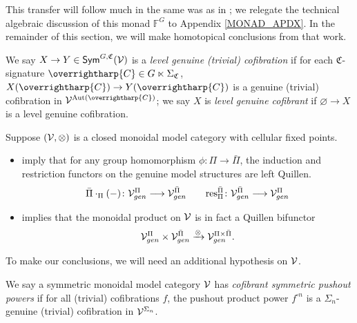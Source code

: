 \documentclass[a4paper,10pt
,draft
]{article}%
\renewcommand{\1}{\eta}%
\newcommand{\SC}{\Sigma_{\mathfrak C}}
\newcommand{\vect}[1]{\text{\overrightharp{\ensuremath{#1}}}}
\begin{document}
This transfer will follow much in the same was as in \cite{BP_geo};
we relegate the technical algebraic discussion of this monad $\mathbb F^G$ to Appendix \ref{MONAD_APDX}.
In the remainder of this section, we will make homotopical conclusions from that work.

\begin{definition}
      We say $X \to Y \in \mathsf{Sym}^{G, \mathfrak C}(\mathcal V)$ is a \textit{level genuine (trivial) cofibration} if
      for each $\mathfrak C$-signature $\vect C \in G \ltimes \SC$,
      $X(\vect C) \to Y(\vect C)$ is a genuine (trivial) cofibration in $\V^{\Aut(\vect C)}$;
      we say $X$ is \textit{level genuine cofibrant} if $\varnothing \to X$ is a level genuine cofibration.
\end{definition}

\begin{lemma}
      \label{RESGEN_LEM}
      Suppose $(\mathcal V, \otimes)$ is a closed monoidal model category with cellular fixed points.
      \begin{itemize}
      \item{\cite[Prop. 6.6, 6.7]{BP_geo}} imply that for any group homomorphism $\phi: \Pi \to \bar \Pi$,
            the induction and restriction functors on the genuine model structures are left Quillen.
            \[
                  \bar{\Pi} \cdot_{\Pi} (-) \colon \mathcal V^{\Pi}_{gen} \longrightarrow \mathcal V^{\bar \Pi}_{gen}
                  \qquad
                  \mathrm{res}^{\bar \Pi}_{\Pi} \colon \mathcal V^{\bar \Pi}_{gen} \longrightarrow \mathcal V^{\Pi}_{gen}
            \]
      \item {\cite[Equation (6.15)]{BP_geo}} implies that the monoidal product on $\mathcal V$ is in fact a Quillen bifunctor
            \[
                  \mathcal V^{\Pi}_{gen} \times \mathcal V^{\bar \Pi}_{gen} \xrightarrow{\otimes} \mathcal V^{\Pi \times \bar \Pi}_{gen}.
            \]
      \end{itemize}
\end{lemma}

To make our conclusions, we will need an additional hypothesis on $\mathcal V$.
\begin{definition}
      \label{CSPP_DEF}
      We say a symmetric monoidal model category $\mathcal V$ has \textit{cofibrant symmetric pushout powers} if
      for all (trivial) cofibrations $f$, the pushout product power $f^{\square n}$
      is a $\Sigma_n$-genuine (trivial) cofibration in $\mathcal V^{\Sigma_n}$. 
\end{definition}
\end{document}
